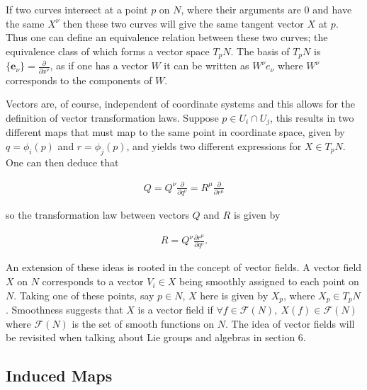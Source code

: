 \documentclass[fleqn, twocolumn, 10pt]{article}
\begin{document}
If two curves intersect at a point $p$ on $N$, where their arguments are 0 and have the same $X^\nu$ then these two curves will give the same tangent vector $X$ at $p$. Thus one can define an equivalence relation between these two curves; the equivalence class of which forms a vector space $T_pN$. The basis of $T_pN$ is $\{\bm{e}_\nu\} = \frac{\partial}{\partial x^\nu}$, as if one has a vector $W$ it can be written as $W^\nu e_\nu$ where $W^\nu$ corresponds to the components of $W$.

Vectors are, of course, independent of coordinate systems and this allows for the definition of vector transformation laws. Suppose $p \in U_i\cap U_j$, this results in two different maps that must map to the same point in coordinate space, given by $q = \phi_i(p)$ and $r = \phi_j(p)$, and yields two different expressions for $X \in T_pN$. One can then deduce that 

\begin{ceqn}
\begin{align*}
Q = Q^\nu \frac{\partial}{\partial q^\nu} = R^\mu \frac{\partial}{\partial r^\mu}
\end{align*}
\end{ceqn}
so the transformation law between vectors $Q$ and $R$ is given by \cite{nakahara2003geometry, kobayashi1963foundations, lumsden2020relativity, kai2015lam}

\begin{ceqn}
\begin{align}\tag{2}
R = Q^\nu\frac{\partial r^\mu}{\partial q^\nu}.
\end{align}
\end{ceqn}

An extension of these ideas is rooted in the concept of vector fields. A vector field $X$ on $N$ corresponds to a vector $V_i \in X$ being smoothly assigned to each point on $N$. Taking one of these points, say $p \in N$, $X$ here is given by $X_{p}$, where $X_{p} \in T_pN$. Smoothness suggests that $X$ is a vector field if $\forall f \in \bm{\mathcal{F}}(N), \:X(f) \in \bm{\mathcal{F}}(N)$ where $\bm{\mathcal{F}}(N)$ is the set of smooth functions on $N$. The idea of vector fields will be revisited when talking about Lie groups and algebras in section 6.


\subsection{Induced Maps}
\end{document}
